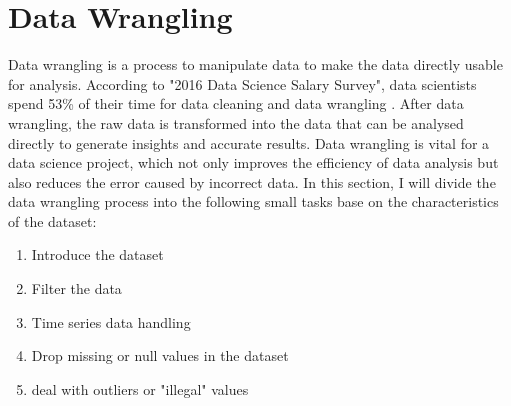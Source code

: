 \documentclass[10pt]{article}
\theoremstyle{definition}
\begin{document}
\section{Data Wrangling} 
\label{dataWrangling}
Data wrangling is a process to manipulate data to make the data directly usable for analysis. According to "2016 Data Science Salary Survey",  data scientists spend 53\% of their time for data cleaning and data wrangling \cite{dataWranglingTomar}. After data wrangling, the raw data is transformed into the data that can be analysed directly to generate insights and accurate results. Data wrangling is vital for a data science project, which not only improves the efficiency of data analysis but also reduces the error caused by incorrect data. In this section, I will divide the data wrangling process into the following small tasks base on the characteristics of the dataset:
\begin{enumerate}
	\item Introduce the dataset
	\item Filter the data
	\item Time series data handling	
	\item Drop missing or null values in the dataset
	\item deal with outliers or "illegal" values
\end{enumerate} \par
\end{document}
